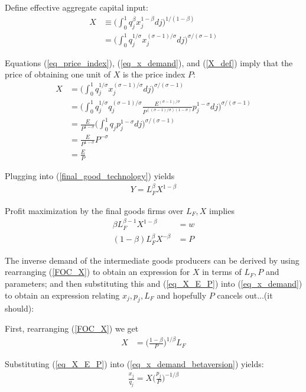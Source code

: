 \documentclass[12pt,english]{article}
\theoremstyle{remark}
\begin{document}
Define effective aggregate capital input:
\begin{align}
X &\equiv \Big( \int_0^1 q_j^{\beta} x_j^{1-\beta} dj \Big)^{1/(1-\beta)} \\
  &= \Big( \int_0^1 q_j^{1/\sigma} x_j^{(\sigma - 1)/\sigma} dj \Big)^{\sigma/(\sigma - 1)} \label{X_def}
\end{align}

Equations (\ref{eq_price_index}), (\ref{eq_x_demand}), and (\ref{X_def}) imply that the price of obtaining one unit of $X$ is the price index $P$: 
\begin{align}
X &= \Big(\int_0^1 q_j^{1/\sigma} x_j^{(\sigma - 1)/\sigma} dj \Big) ^{\sigma/(\sigma -1)} \nonumber \\
  &= \Big(\int_0^1 q_j^{1/\sigma} q_j^{(\sigma - 1)/\sigma} \frac{E^{(\sigma-1)/\sigma}}{P^{((\sigma -1)/\sigma) (1-\sigma)}} p_j^{1-\sigma}dj \Big) ^{\sigma/(\sigma -1)} \nonumber \\
  &= \frac{E}{P^{1-\sigma}} \Big( \int_0^1 q_j p_j^{1-\sigma} dj \Big)^{\sigma/(\sigma -1)} \nonumber \\
  &= \frac{E}{P^{1-\sigma}}P^{-\sigma} \nonumber \\
  &= \frac{E}{P} \label{eq_X_E_P}
\end{align}

Plugging into (\ref{final_good_technology}) yields 
\begin{align*}
Y = L_F^{\beta} X^{1-\beta} 
\end{align*}

Profit maximization by the final goods firms over $L_F,X$ implies
\begin{align}
\beta L_F^{\beta -1} X^{1-\beta} &= w \label{FOC_L} \\ 
(1-\beta) L_F^{\beta} X^{-\beta} &= P \label{FOC_X}
\end{align}

The inverse demand of the intermediate goods producers can be derived by using rearranging (\ref{FOC_X}) to obtain an expression for $X$ in terms of $L_F,P$ and parameters; and then substituting this and (\ref{eq_X_E_P}) into (\ref{eq_x_demand}) to obtain an expression relating $x_j,p_j,L_F$ and hopefully $P$ cancels out...(it should):

First, rearranging (\ref{FOC_X}) we get 
\begin{align}
X &= \Big(\frac{1-\beta}{P}\Big)^{1/\beta} L_F \label{big_X_eq}
\end{align}

Substituting (\ref{eq_X_E_P}) into (\ref{eq_x_demand_betaversion}) yields:
\begin{align}
\frac{x_j}{q_j} = X \Big(\frac{p_j}{P}\Big)^{-1/\beta} \label{x_demand_X}
\end{align}
\end{document}
